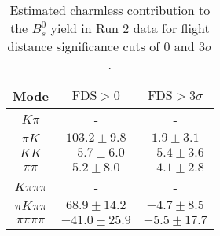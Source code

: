 \begin{table}[h]
  \centering
  \begin{tabular}{ccc}
      \toprule
      Mode & $\mathrm{FDS} > 0$ & $\mathrm{FDS} > 3\sigma$ \\
      \midrule
      $K\pi$ & \-- & \-- \\
      $\pi K$ & $103.2 \pm 9.8$ & $1.9 \pm 3.1$ \\
      $KK$ & $-5.7 \pm 6.0$ & $-5.4 \pm 3.6$ \\
      $\pi\pi$ & $5.2 \pm 8.0$ & $-4.1 \pm 2.8$ \\
      $K\pi\pi\pi$ & \-- & \-- \\
      $\pi K\pi\pi$ & $68.9 \pm 14.2$ & $-4.7 \pm 8.5$ \\
      $\pi\pi\pi\pi$ & $-41.0 \pm 25.9$ & $-5.5 \pm 17.7$ \\
      \bottomrule
  \end{tabular}
  \caption{\small Estimated charmless contribution to the $B^{0}_{s}$ yield in Run 2 data for flight distance significance cuts of 0  and $3\sigma$.}
\label{tab:charmless_yields_Bs_run_2}
\end{table}
